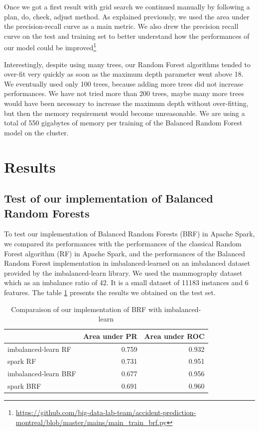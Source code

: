 \documentclass[conference]{IEEEtran}
\begin{document}
Once we got a first result with grid search we continued manually by
following a plan, do, check, adjust method. As explained previously, we used the area under the precision-recall curve as a main metric. We also drew the precision recall curve on the test and training set to better understand how the performances of our model could be improved\footnote{\url{https://github.com/big-data-lab-team/accident-prediction-montreal/blob/master/mains/main\_train\_brf.py}}

Interestingly, despite using many trees, our Random Forest algorithms
tended to over-fit very quickly as soon as the maximum depth parameter went
above 18. We eventually used only 100 trees, because adding more trees did
not increase performances. We have not tried more than 200 trees, maybe
many more trees would have been necessary to increase the maximum depth
without over-fitting, but then the memory requirement would become unreasonable.
We are using a total of 550 gigabytes of memory per training of the Balanced Random Forest
model on the cluster.

\section{Results}

\subsection{Test of our implementation of Balanced Random Forests}
To test our implementation of Balanced Random Forests (BRF) in Apache Spark, we compared its performances with the performances of the classical Random Forest algorithm (RF) in Apache Spark, and the performances of the Balanced Random Forest implementation in 
imbalanced-learned\cite{imbalance} on an imbalanced dataset provided by the imbalanced-learn library. We used the mammography dataset which as an imbalance ratio of 42. It is a small dataset of 11183 instances and 6 features. The table \ref{table:test_brf_results} presents the results we obtained on the test set.

\begin{table}[htbp]
\caption{Comparaison of our implementation of BRF with imbalanced-learn}
\begin{center}
\begin{tabular}{|l|r|r|}
\hline
{} &  Area under PR &  Area under ROC \\
\hline
imbalanced-learn RF  &          0.759 &           0.932 \\
spark RF             &          0.731 &           0.951 \\
imbalanced-learn BRF &          0.677 &           0.956 \\
spark BRF            &          0.691 &           0.960 \\
\hline
\end{tabular}
\label{table:test_brf_results}
\end{center}
\end{table}
\end{document}
